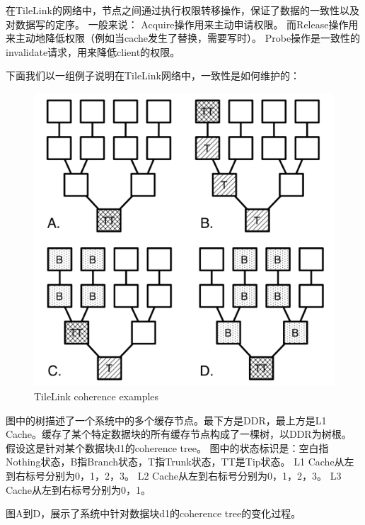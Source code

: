 \begin{center}
在TileLink的网络中，节点之间通过执行权限转移操作，保证了数据的一致性以及对数据写的定序。
一般来说：
Acquire操作用来主动申请权限。
而Release操作用来主动地降低权限（例如当cache发生了替换，需要写时）。
Probe操作是一致性的invalidate请求，用来降低client的权限。

下面我们以一组例子说明在TileLink网络中，一致性是如何维护的：
\begin{figure}[H] %
\centering %
\includegraphics[width=\textwidth]{Img/TileLink_coherence.PNG} %
\caption{TileLink coherence examples} %
\label{TileLink_coherence} %
\end{figure}

图中的树描述了一个系统中的多个缓存节点。最下方是DDR，最上方是L1 Cache。缓存了某个特定数据块的所有缓存节点构成了一棵树，以DDR为树根。
假设这是针对某个数据块d1的coherence tree。
图中的状态标识是：空白指Nothing状态，B指Branch状态，T指Trunk状态，TT是Tip状态。
L1 Cache从左到右标号分别为0，1，2，3。
L2 Cache从左到右标号分别为0，1，2，3。
L3 Cache从左到右标号分别为0，1。

图A到D，展示了系统中针对数据块d1的coherence tree的变化过程。


\end{center}
